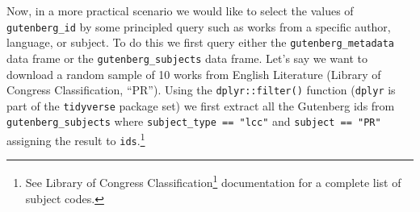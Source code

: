 \documentclass[
]{article}
\newenvironment{Shaded}{\begin{snugshade}}{\end{snugshade}}
\newcommand{\AttributeTok}[1]{\textcolor[rgb]{0.77,0.63,0.00}{#1}}
\newcommand{\CommentTok}[1]{\textcolor[rgb]{0.56,0.35,0.01}{\textit{#1}}}
\newcommand{\FunctionTok}[1]{\textcolor[rgb]{0.00,0.00,0.00}{#1}}
\newcommand{\NormalTok}[1]{#1}
\newcommand{\OtherTok}[1]{\textcolor[rgb]{0.56,0.35,0.01}{#1}}
\newcommand{\StringTok}[1]{\textcolor[rgb]{0.31,0.60,0.02}{#1}}
\DeclareRobustCommand{\href}[2]{#2\footnote{\url{#1}}}
\begin{document}
\begin{Shaded}
\end{Shaded}

Now, in a more practical scenario we would like to select the values of \texttt{gutenberg\_id} by some principled query such as works from a specific author, language, or subject. To do this we first query either the \texttt{gutenberg\_metadata} data frame or the \texttt{gutenberg\_subjects} data frame. Let's say we want to download a random sample of 10 works from English Literature (Library of Congress Classification, ``PR''). Using the \texttt{dplyr::filter()} function (\texttt{dplyr} is part of the \texttt{tidyverse} package set) we first extract all the Gutenberg ids from \texttt{gutenberg\_subjects} where \texttt{subject\_type\ ==\ "lcc"} and \texttt{subject\ ==\ "PR"} assigning the result to \texttt{ids}.\footnote{See \href{https://www.loc.gov/catdir/cpso/lcco/}{Library of Congress Classification} documentation for a complete list of subject codes.}
\end{document}

